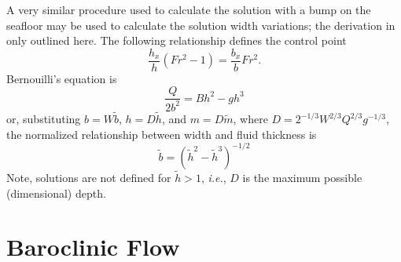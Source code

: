 \documentclass[11pt]{report}
\numberwithin{equation}{section}
\begin{document}
% 

A very similar procedure used to calculate the solution with a bump on the seafloor may be used to calculate the solution width variations; the derivation in only outlined here. The following relationship defines the control point
\begin{equation}
    \frac{h_x}{h}(Fr^2 - 1) = \frac{b_x}{b}Fr^2.
\end{equation}
Bernouilli's equation is
\begin{equation}
    \frac{Q}{2 b^2} = Bh^2 - g h^3
\end{equation}
or, substituting $b=W\tilde{b}$, $h=D\tilde{h}$, and $m=D\tilde{m}$, where $D = 2^{-1/3} W^{2/3} Q^{2/3} g^{-1/3}$, the normalized relationship between width and fluid thickness is
\begin{equation}
    \tilde{b} = (\tilde{h}^2 - \tilde{h}^3)^{-1/2}
\end{equation}
Note, solutions are not defined for $\tilde{h} > 1$, \emph{i.e.}, $D$ is the maximum possible (dimensional) depth.





\chapter{Baroclinic Flow}
\end{document}
